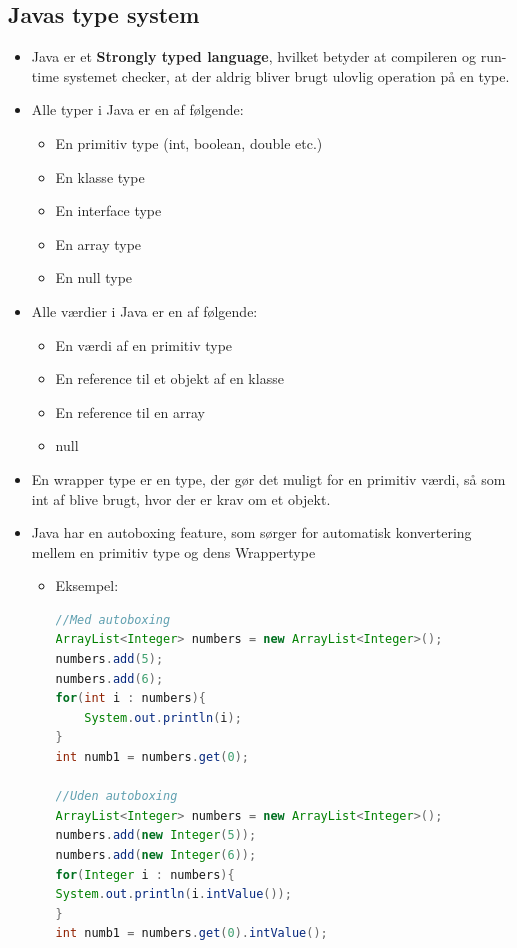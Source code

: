 \documentclass{article}
\begin{document}
\subsection{Javas type system}
\begin{itemize}
	\item Java er et \textbf{Strongly typed language}, hvilket betyder at compileren og run-time systemet checker, at der aldrig bliver brugt ulovlig operation på en type. 
	\item Alle typer i Java er en af følgende:
	\begin{itemize}
		\item En primitiv type (int, boolean, double etc.)
		\item En klasse type
		\item En interface type
		\item En array type 
		\item En null type 
	\end{itemize}
	\item Alle værdier i Java er en af følgende: 
	\begin{itemize}
		\item En værdi af en primitiv type
		\item En reference til et objekt af en klasse
		\item En reference til en array
		\item null
	\end{itemize}
	\item En wrapper type er en type, der gør det muligt for en primitiv værdi, så som int af blive brugt, hvor der er krav om et objekt.
	\item Java har en autoboxing feature, som sørger for automatisk konvertering mellem en primitiv type og dens Wrappertype
	\begin{itemize}
		\item Eksempel:

\begin{lstlisting}[language=java]
//Med autoboxing
ArrayList<Integer> numbers = new ArrayList<Integer>();
numbers.add(5);
numbers.add(6);
for(int i : numbers){
	System.out.println(i);
}
int numb1 = numbers.get(0);

//Uden autoboxing
ArrayList<Integer> numbers = new ArrayList<Integer>();
numbers.add(new Integer(5));
numbers.add(new Integer(6));
for(Integer i : numbers){
System.out.println(i.intValue());
}
int numb1 = numbers.get(0).intValue();


\end{lstlisting}
\end{itemize}
\end{itemize}
\end{document}
